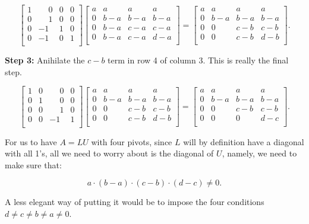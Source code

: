 \documentclass{article}
\begin{document}
\[
\begin{bmatrix}
1 & \phantom{-}0 & 0 & 0\\
0 & \phantom{-}1 & 0 & 0\\
0 & -1 & 1 & 0\\
0 & -1 & 0 & 1\\
\end{bmatrix}
\begin{bmatrix}
a & a & a & a\\
0 & b - a & b - a & b - a\\
0 & b - a & c - a & c - a\\
0 & b - a & c - a & d - a\\
\end{bmatrix}
=
\begin{bmatrix}
a & a & a & a\\
0 & b - a & b - a & b - a\\
0 & 0 & c - b & c - b\\
0 & 0 & c - b & d - b\\
\end{bmatrix}.
\]

\noindent \textbf{Step 3:} Anihilate the $c - b$ term in row 4 of column 3. This is really the final step.

\[
\begin{bmatrix}
1 & 0 & \phantom{-}0 & 0\\
0 & 1 & \phantom{-}0 & 0\\
0 & 0 & \phantom{-}1 & 0\\
0 & 0 & -1 & 1\\
\end{bmatrix}
\begin{bmatrix}
a & a & a & a\\
0 & b - a & b - a & b - a\\
0 & 0 & c - b & c - b\\
0 & 0 & c - b & d - b\\
\end{bmatrix}
=
\begin{bmatrix}
a & a & a & a\\
0 & b - a & b - a & b - a\\
0 & 0 & c - b & c - b\\
0 & 0 & 0 & d - c\\
\end{bmatrix}.
\]

For us to have $A = LU$ with four pivots, since $L$ will by definition have a diagonal with all 1's, all we need to worry about is the diagonal of $U$, namely, we need to make sure that:

\[
a \cdot (b - a) \cdot (c - b) \cdot (d - c) \neq 0.
\]

A less elegant way of putting it would be to impose the four conditions $d \neq c \neq b \neq a \neq 0$.
\end{document}
